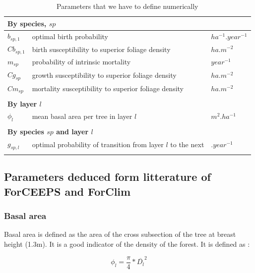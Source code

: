\documentclass{article}
\begin{document}
\begin{table}[H]
    \centering
    \begin{tabular}{l l l}
    \hline
    \hline
    \multicolumn{3}{l}{\textbf{By species}, $sp$} \\
    \hline
    $b_{sp,1}$     & optimal birth probability                              & $ha^{-1}.year^{-1}$ \\
    $Cb_{sp,1}$    & birth susceptibility to superior foliage density       & $ha.m^{-2}$       \\
    $m_{sp}$       & probability of intrinsic mortality                     & $year^{-1}$ \\
    $Cg_{sp}$      & growth susceptibility to superior foliage density      & $ha.m^{-2}$           \\
    $Cm_{sp}$      & mortality susceptibility to superior foliage density   & $ha.m^{-2}$           \\    
    \\
    \multicolumn{3}{l}{\textbf{By layer $l$}} \\
    \hline
    $\phi_{l}$  & mean basal area per tree in layer $l$        & $m^{2}.ha^{-1}$  \\
    \\
    \multicolumn{3}{l}{\textbf{By species $sp$ and layer $l$}} \\
    \hline
    $g_{sp,l}$     & optimal probability of transition from layer $l$ to the next & $.year^{-1}$ \\
    \\
    \hline
    \hline
    \end{tabular}
    \caption{Parameters that we have to define numerically}
    \label{tab:coeftoparam} 
\end{table}

\subsection{Parameters deduced form litterature of ForCEEPS and ForClim}

\subsubsection{Basal area}

Basal area is defined as the area of the cross subsection of the tree at breast height (1.3m). It is a good indicator of the density of the forest. It is defined as : 

\begin{equation}
    \phi_{l} = \frac{\pi}{4} * \overline{D_{l}}^2
\end{equation}
\end{document}
